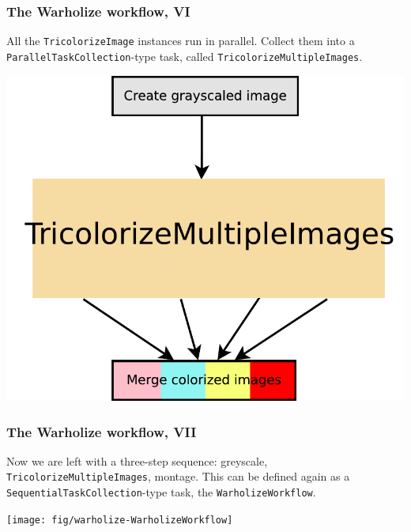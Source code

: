 \documentclass[english,serif,mathserif,xcolor=pdftex,dvipsnames,table]{beamer}
\begin{document}
\begin{frame}
  \frametitle{The Warholize workflow, VI}

  All the \texttt{TricolorizeImage} instances run in parallel. Collect
  them into a \texttt{ParallelTaskCollection}-type task, called
  \texttt{TricolorizeMultipleImages}.

  \+
  \includegraphics[height=0.60\textheight]{fig/warholize-TricolorizeMultipleImages}
\end{frame}

\begin{frame}
  \frametitle{The Warholize workflow, VII}

  Now we are left with a three-step sequence: greyscale,
  \texttt{TricolorizeMultipleImages}, montage.  This can be defined
  again as a \texttt{SequentialTaskCollection}-type task, the
  \texttt{WarholizeWorkflow}.

  \+
  \texttt{[image: fig/warholize-WarholizeWorkflow]}
\end{frame}
\end{document}
